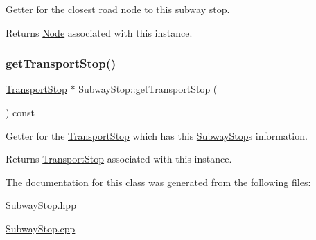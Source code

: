 Getter for the closest road node to this subway stop.

\begin{DoxyReturn}{Returns}
\hyperlink{class_node}{Node} associated with this instance. 
\end{DoxyReturn}
\hypertarget{class_subway_stop_a5cc277b4da7f0decf74518de16b2966b}{}\label{class_subway_stop_a5cc277b4da7f0decf74518de16b2966b} 
\subsubsection{\texorpdfstring{get\+Transport\+Stop()}{getTransportStop()}}
{\footnotesize\ttfamily \hyperlink{class_transport_stop}{Transport\+Stop} $\ast$ Subway\+Stop\+::get\+Transport\+Stop (\begin{DoxyParamCaption}{ }\end{DoxyParamCaption}) const}

Getter for the \hyperlink{class_transport_stop}{Transport\+Stop} which has this \hyperlink{class_subway_stop}{Subway\+Stop}\textquotesingle{}s information.

\begin{DoxyReturn}{Returns}
\hyperlink{class_transport_stop}{Transport\+Stop} associated with this instance. 
\end{DoxyReturn}


The documentation for this class was generated from the following files\+:\begin{DoxyCompactItemize}
\item 
\hyperlink{_subway_stop_8hpp}{Subway\+Stop.\+hpp}\item 
\hyperlink{_subway_stop_8cpp}{Subway\+Stop.\+cpp}\end{DoxyCompactItemize}
